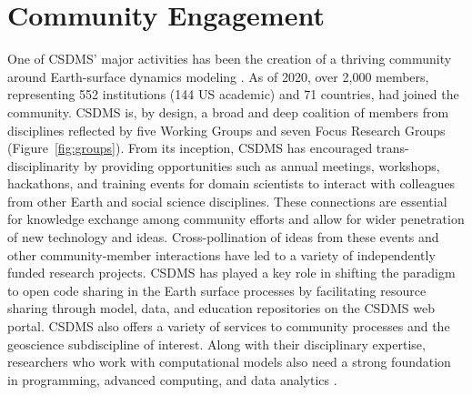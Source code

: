 \documentclass{article} %
\begin{document}








\section{Community Engagement}
\label{sec:community}

One of CSDMS' major activities has been the creation of a thriving community around Earth-surface dynamics modeling \citep{overeem2013strategies}. As of 2020, over 2,000 members, representing 552 institutions (144 US academic) and 71 countries, had joined the community.  CSDMS is, by design, a broad and deep coalition of members from disciplines reflected by five Working Groups and seven Focus Research Groups (Figure~\ref{fig:groups}).  From its inception, CSDMS has encouraged trans-disciplinarity by providing opportunities such as annual meetings, workshops, hackathons, and training events for domain scientists to interact with colleagues from other Earth and social science disciplines.  These connections are essential for knowledge exchange among community efforts and allow for wider penetration of new technology and ideas. Cross-pollination of ideas from these events and other community-member interactions have led to a variety of independently funded research projects. CSDMS has played a key role in shifting the paradigm to open code sharing in the Earth surface processes by facilitating resource sharing through model, data, and education repositories on the CSDMS web portal.  CSDMS also offers a variety of services to community processes and the geoscience subdiscipline of interest.   Along with their disciplinary expertise, researchers who work with computational models also need a strong foundation in programming, advanced computing, and data analytics  \citep{atkins2011national}.
\end{document}
